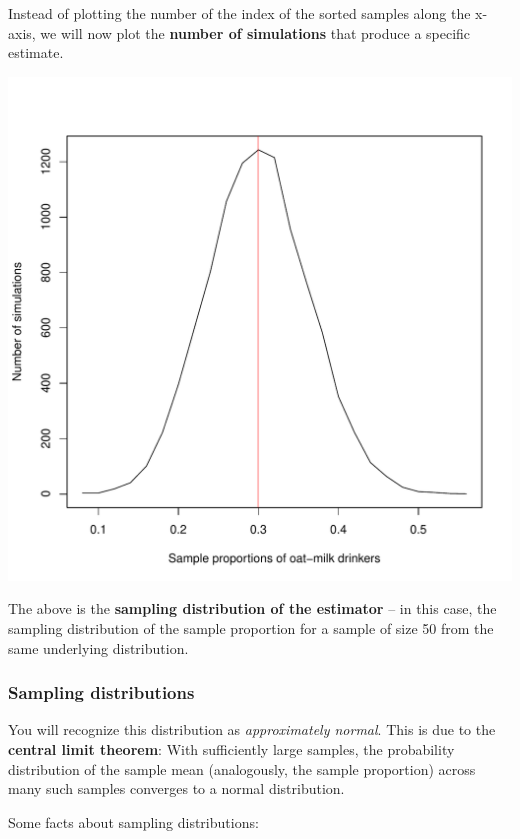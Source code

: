 \documentclass[
  11pt,
]{article}
\begin{document}
Instead of plotting the number of the index of the sorted samples along the x-axis, we will now plot the \textbf{number of simulations} that produce a specific estimate.

\begin{center}\includegraphics{01-01-lec_files/figure-latex/sampling-dist-1} \end{center}

The above is the \textbf{sampling distribution of the estimator} -- in this case, the sampling distribution of the sample proportion for a sample of size 50 from the same underlying distribution.

\hypertarget{sampling-distributions}{%
\subsubsection{Sampling distributions}\label{sampling-distributions}}

You will recognize this distribution as \emph{approximately normal}. This is due to the \textbf{central limit theorem}: With sufficiently large samples, the probability distribution of the sample mean (analogously, the sample proportion) across many such samples converges to a normal distribution.

Some facts about sampling distributions:
\end{document}
